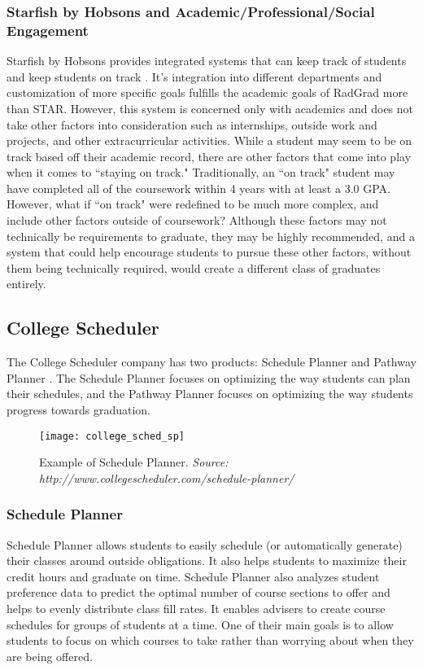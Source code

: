 \subsubsection{Starfish by Hobsons and Academic/Professional/Social Engagement}
Starfish by Hobsons provides integrated systems that can keep track of students and keep students on track \cite{Starfish}. It's integration into different departments and customization of more specific goals fulfills the academic goals of RadGrad more than STAR. However, this system is concerned only with academics and does not take other factors into consideration such as internships, outside work and projects, and other extracurricular activities. While a student may seem to be on track based off their academic record, there are other factors that come into play when it comes to ``staying on track." Traditionally, an ``on track" student may have completed all of the coursework within 4 years with at least a 3.0 GPA. However, what if ``on track" were redefined to be much more complex, and include other factors outside of coursework? Although these factors may not technically be requirements to graduate, they may be highly recommended, and a system that could help encourage students to pursue these other factors, without them being technically required, would create a different class of graduates entirely. 

\subsection{College Scheduler}
The College Scheduler company has two products: Schedule Planner and Pathway Planner  \cite{CollegeScheduler}. The Schedule Planner focuses on optimizing the way students can plan their schedules, and the Pathway Planner focuses on optimizing the way students progress towards graduation.

\begin{figure}[h]
\centering
\texttt{[image: college\_sched\_sp]}
\caption{Example of Schedule Planner. \textit{Source: http://www.collegescheduler.com/schedule-planner/}}
\end{figure}


\subsubsection{Schedule Planner}
Schedule Planner allows students to easily schedule (or automatically generate) their classes around outside obligations. It also helps students to maximize their credit hours and graduate on time. Schedule Planner also analyzes student preference data to predict the optimal number of course sections to offer and helps to evenly distribute class fill rates. It enables advisers to create course schedules for groups of students at a time. One of their main goals is to allow students to focus on which courses to take rather than worrying about when they are being offered.

